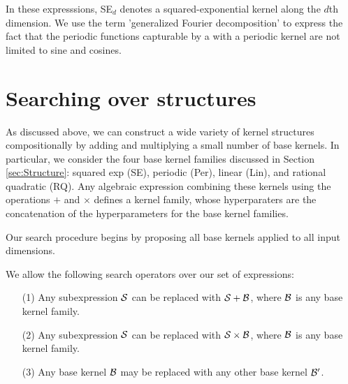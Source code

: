 \documentclass[twoside]{article}
\begin{document}
In these expresssions, SE$_d$ denotes a squared-exponential kernel along the $d$th dimension.
We use the term 'generalized Fourier decomposition' to express the fact that the periodic functions capturable by a \gp{} with a periodic kernel are not limited to sine and cosines.




%

\section{Searching over structures}


As discussed above, we can construct a wide variety of kernel structures compositionally by adding and multiplying a small number of base kernels. In particular, we consider the four base kernel families discussed in Section \ref{sec:Structure}: squared exp (SE), periodic (Per), linear (Lin), and rational quadratic (RQ). Any algebraic expression combining these kernels using the operations $+$ and $\times$ defines a kernel family, whose hyperparaters are the concatenation of the hyperparameters for the base kernel families. 

Our search procedure begins by proposing all base kernels applied to all input dimensions. 

We allow the following search operators over our set of expressions:
\begin{itemize}
\item[(1)] Any subexpression ${\cal S}$ can be replaced with ${\cal S} + {\cal B}$, where ${\cal B}$ is any base kernel family.
\item[(2)] Any subexpression ${\cal S}$ can be replaced with ${\cal S} \times {\cal B}$, where ${\cal B}$ is any base kernel family.
\item[(3)] Any base kernel ${\cal B}$ may be replaced with any other base kernel ${\cal B}^\prime$.
\end{itemize}
\end{document}
